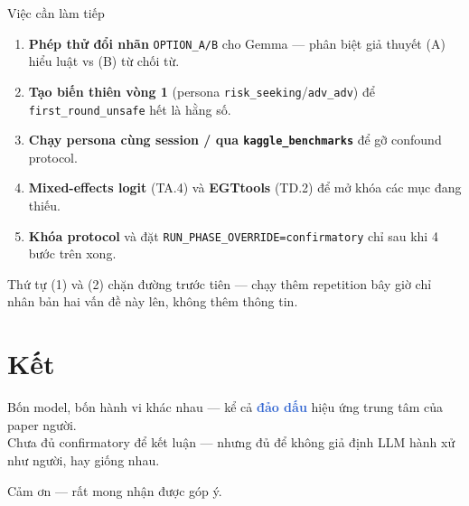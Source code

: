 \documentclass[9pt,aspectratio=169]{beamer}
\newcommand{\bad}[1]{\textcolor{highlight}{\textbf{#1}}}
\begin{document}
\begin{frame}{Việc cần làm tiếp}
\begin{enumerate}\small\setlength\itemsep{4pt}
\item \textbf{Phép thử đổi nhãn} \texttt{OPTION\_A/B} cho Gemma --- phân biệt giả thuyết (A) hiểu luật vs (B) từ chối từ.
\item \textbf{Tạo biến thiên vòng 1} (persona \texttt{risk\_seeking}/\texttt{adv\_adv}) để \texttt{first\_round\_unsafe} hết là hằng số.
\item \textbf{Chạy persona cùng session / qua \texttt{kaggle\_benchmarks}} để gỡ confound protocol.
\item \textbf{Mixed-effects logit} (TA.4) và \textbf{EGTtools} (TD.2) để mở khóa các mục đang thiếu.
\item \textbf{Khóa protocol} và đặt \texttt{RUN\_PHASE\_OVERRIDE=confirmatory} chỉ sau khi 4 bước trên xong.
\end{enumerate}
\vspace{0.4em}
\begin{exampleblock}{Thứ tự}
\small (1) và (2) chặn đường trước tiên --- chạy thêm repetition bây giờ chỉ nhân bản hai vấn đề này lên, không thêm thông tin.
\end{exampleblock}
\end{frame}

\section{Kết}

\begin{frame}[standout]
Bốn model, bốn hành vi khác nhau --- kể cả \bad{đảo dấu} hiệu ứng trung tâm của paper người.\\[8pt]
\small\color{accent} Chưa đủ confirmatory để kết luận --- nhưng đủ để không giả định LLM hành xử như người, hay giống nhau.
\end{frame}

\begin{frame}[standout]
Cảm ơn --- rất mong nhận được góp ý.
\end{frame}

\appendix
\end{document}
